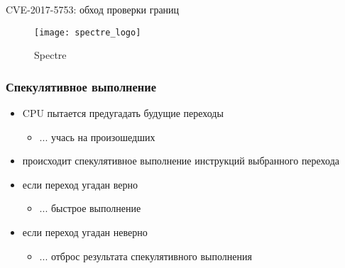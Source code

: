 \begin{frame}{\insertsubsection}

  CVE-2017-5753: обход проверки границ

  \begin{figure}[h]
    \texttt{[image: spectre\_logo]}
    \caption{Spectre}
  \end{figure}

  \note{


  }
\end{frame}

\subsubsection{Спекулятивное выполнение}
\begin{frame}{\insertsubsubsection}

  \begin{itemize}
  \item CPU пытается предугадать будущие переходы
    \begin{itemize}
    \item ... учась на произошедших
    \end{itemize}
  \item происходит спекулятивное выполнение инструкций выбранного перехода
  \item если переход угадан верно
    \begin{itemize}
    \item ... быстрое выполнение
    \end{itemize}
  \item если переход угадан неверно
    \begin{itemize}
    \item ... отброс результата спекулятивного выполнения
    \end{itemize}
  \end{itemize}

\end{frame}

